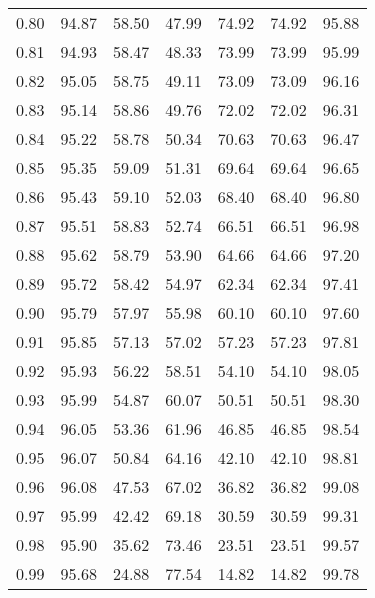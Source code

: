 \begin{tabular}{|c|c|c|c|c|c|c|}
      0.80 &     94.87 &     58.50 &      47.99 &   74.92 &      74.92 &         95.88 \\
      0.81 &     94.93 &     58.47 &      48.33 &   73.99 &      73.99 &         95.99 \\
      0.82 &     95.05 &     58.75 &      49.11 &   73.09 &      73.09 &         96.16 \\
      0.83 &     95.14 &     58.86 &      49.76 &   72.02 &      72.02 &         96.31 \\
      0.84 &     95.22 &     58.78 &      50.34 &   70.63 &      70.63 &         96.47 \\
      0.85 &     95.35 &     59.09 &      51.31 &   69.64 &      69.64 &         96.65 \\
      0.86 &     95.43 &     59.10 &      52.03 &   68.40 &      68.40 &         96.80 \\
      0.87 &     95.51 &     58.83 &      52.74 &   66.51 &      66.51 &         96.98 \\
      0.88 &     95.62 &     58.79 &      53.90 &   64.66 &      64.66 &         97.20 \\
      0.89 &     95.72 &     58.42 &      54.97 &   62.34 &      62.34 &         97.41 \\
      0.90 &     95.79 &     57.97 &      55.98 &   60.10 &      60.10 &         97.60 \\
      0.91 &     95.85 &     57.13 &      57.02 &   57.23 &      57.23 &         97.81 \\
      0.92 &     95.93 &     56.22 &      58.51 &   54.10 &      54.10 &         98.05 \\
      0.93 &     95.99 &     54.87 &      60.07 &   50.51 &      50.51 &         98.30 \\
      0.94 &     96.05 &     53.36 &      61.96 &   46.85 &      46.85 &         98.54 \\
      0.95 &     96.07 &     50.84 &      64.16 &   42.10 &      42.10 &         98.81 \\
      0.96 &     96.08 &     47.53 &      67.02 &   36.82 &      36.82 &         99.08 \\
      0.97 &     95.99 &     42.42 &      69.18 &   30.59 &      30.59 &         99.31 \\
      0.98 &     95.90 &     35.62 &      73.46 &   23.51 &      23.51 &         99.57 \\
      0.99 &     95.68 &     24.88 &      77.54 &   14.82 &      14.82 &         99.78 \\
\bottomrule
\end{tabular}
